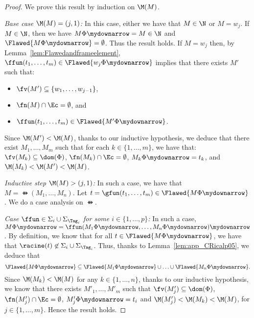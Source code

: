 \begin{proof}
 We prove this result by induction on $\M(M)$.

\smallskip{}


 \noindent\emph{Base case $\M(M) = (j, 1)$:} In this case, either we
 have that $M \in \N$ or $M = w_j$. If $M \in \N$, then we have
 $M\Phi\mydownarrow = M \in \N$ and $\Flawed{M\Phi\mydownarrow} =
 \emptyset$. Thus the result holds. If $M = w_j$
then, by Lemma~\ref{lem:Flawedandframeelement},
$\ffun(t_1, \ldots, t_m) \in
 \Flawed{w_j\Phi\mydownarrow}$ implies that 
there exists $M'$ such that:
\begin{itemize}
\item  $\fv(M') \subseteq
 \{w_1, \ldots, w_{j-1}\}$, 
\item $\fn(M) \cap \Ec = \emptyset$, and 
\item $\ffun(t_1,
 \ldots, t_m) \in \Flawed{M'\Phi\mydownarrow}$.
\end{itemize} 
Since $\M(M') < \M(M)$, thanks to
 our inductive hypothesis, we  deduce that there exist $M_1, \ldots, M_m$
 such that for each $k \in \{1,
 \ldots, m\}$, we have that:
$\fv(M_k) \subseteq \dom(\Phi)$, $\fn(M_k) \cap \Ec =
  \emptyset$,
 $M_k\Phi\mydownarrow = t_k$, and 
$\M(M_k) < \M(M') < \M(M)$.

 \medskip

 \noindent \emph{Inductive step $\M(M) > (j,1)$:} In such a case, we have that $M = \ffun(M_1,
 \ldots, M_n)$. Let $t = \gfun(t_1, \ldots, t_m) \in
 \Flawed{M\Phi\mydownarrow}$. We do a case analysis on $\ffun$.

\smallskip{}

 \emph{Case $\ffun \in \Sigma_i \cup \Sigma_{\Tag_i}$ for some $i \in
   \{1,\ldots,p\}$:} In such a  case, $M\Phi\mydownarrow = \ffun(M_1\Phi\mydownarrow, \ldots,
 M_n\Phi\mydownarrow)\mydownarrow$. By definition, we know that for all $t \in
 \Flawed{M\Phi\mydownarrow}$, we have that $\racine(t) \not\in \Sigma_i \cup
 \Sigma_{\Tag_i}$. Thus, thanks to Lemma~\ref{lem:app_CRicalp05}, we 
 deduce that 
\[
\Flawed{M\Phi\mydownarrow} \subseteq  \Flawed{M_1\Phi\mydownarrow}
\cup \ldots \cup \Flawed{M_n\Phi\mydownarrow}.
\] 
Since $\M(M_k)
 < \M(M)$ for any $k \in \{1,\ldots, n\}$, thanks to our inductive hypothesis, we know that there exists $M'_1,
 \ldots, M'_m$ such that $\fv(M'_j) \subseteq \dom(\Phi)$, $\fn(M'_j) \cap \Ec =
 \emptyset$, $M'_j\Phi\mydownarrow = t_i$ and $\M(M'_j) < \M(M_k) < \M(M)$, for
 $j \in \{1, \ldots, m\}$. Hence the result holds.

\smallskip{}


\end{proof}
